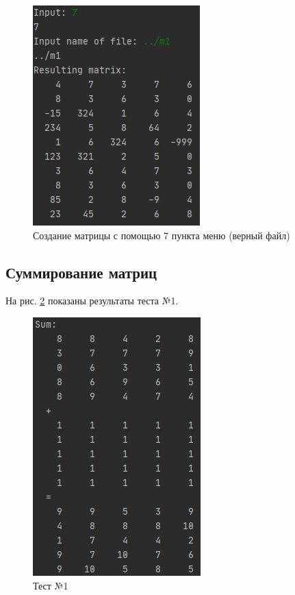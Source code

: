 \begin{figure}[hpt!]
	\centering
	\includegraphics[width=0.6\linewidth]{photo/matrix_creation7.success}
	\caption{Создание матрицы с помощью 7 пункта меню (верный файл)}
	\label{matrix_creation7.success}
\end{figure}

\newpage

\subsection*{Суммирование матриц}

На рис. \ref{sum1} показаны результаты теста №1.

\begin{figure}[hpt!]
	\centering
	\includegraphics[width=0.6\linewidth]{photo/sum1(5x5)}
	\caption{Тест №1}
	\label{sum1}
\end{figure}

